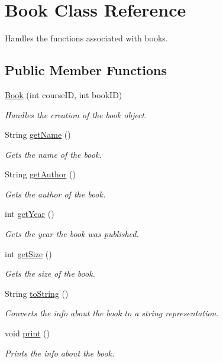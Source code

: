 \hypertarget{classBook}{}\section{Book Class Reference}
\label{classBook}


Handles the functions associated with books.  


\subsection*{Public Member Functions}
\begin{DoxyCompactItemize}
\item 
\hyperlink{classBook_ab6a63fd56ba7cb9e791d1fa0eb3e052e}{Book} (int course\+I\+D, int book\+I\+D)
\begin{DoxyCompactList}\small\item\em Handles the creation of the book object. \end{DoxyCompactList}\item 
String \hyperlink{classBook_a85b4799722b8bad19c4ecd7c035a44a9}{get\+Name} ()
\begin{DoxyCompactList}\small\item\em Gets the name of the book. \end{DoxyCompactList}\item 
String \hyperlink{classBook_a161fc83fc6a0117fcf1874fee9fa7939}{get\+Author} ()
\begin{DoxyCompactList}\small\item\em Gets the author of the book. \end{DoxyCompactList}\item 
int \hyperlink{classBook_a3c23ab8992a9ff0ca02474b72cb622ee}{get\+Year} ()
\begin{DoxyCompactList}\small\item\em Gets the year the book was published. \end{DoxyCompactList}\item 
int \hyperlink{classBook_a0b11764999dd3fb2819de911902a0979}{get\+Size} ()
\begin{DoxyCompactList}\small\item\em Gets the size of the book. \end{DoxyCompactList}\item 
String \hyperlink{classBook_a496b8220287e6703499a707c8b01516c}{to\+String} ()
\begin{DoxyCompactList}\small\item\em Converts the info about the book to a string representation. \end{DoxyCompactList}\item 
\hypertarget{classBook_a14649f11ec81e6c5b5d59b235160e6a6}{}void \hyperlink{classBook_a14649f11ec81e6c5b5d59b235160e6a6}{print} ()\label{classBook_a14649f11ec81e6c5b5d59b235160e6a6}

\begin{DoxyCompactList}\small\item\em Prints the info about the book. \end{DoxyCompactList}\end{DoxyCompactItemize}


